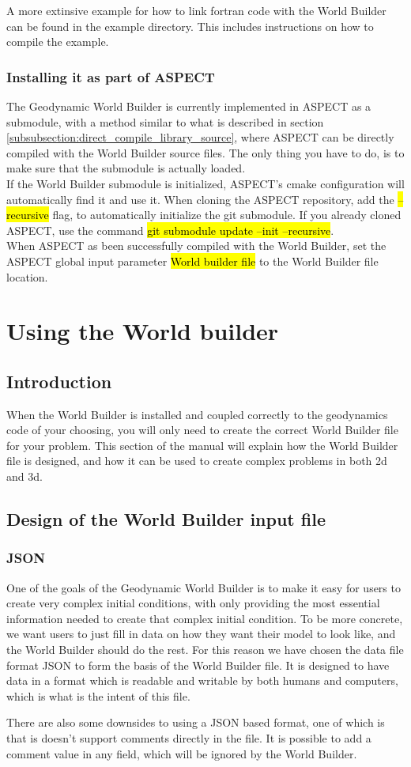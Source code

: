\documentclass{book}
\newcommand{\GWB}{{Geodynamic World Builder}}
\newcommand{\WB}{{World Builder}}
\newcommand{\aspect}{{ASPECT}}
\newcommand{\cmake}{{cmake}}
\begin{document}
A more extinsive example for how to link fortran code with the \WB{} can be found in the example directory. This includes instructions on how to compile the example.

\subsection{Installing it as part of ASPECT}
The \GWB{} is currently implemented in \aspect{} as a submodule, with a method similar to what is described in section \ref{subsubsection:direct_compile_library_source}, where ASPECT can be directly compiled with the \WB{} source files. The only thing you have to do, is to make sure that the submodule is actually loaded.
\\
 If the \WB{} submodule is initialized, \aspect{}'s \cmake{} configuration will automatically find it and use it. When cloning the \aspect{} repository, add the \hl{--recursive} flag, to automatically initialize the git submodule. If you already cloned \aspect{}, use the command \hl{git submodule update --init --recursive}. 
 \\
 When \aspect{} as been successfully compiled with the \WB{}, set the \aspect{} global input parameter \hl{World builder file} to the \WB{} file location. 


\chapter{Using the World builder}
\section{Introduction}
When the \WB{} is installed and coupled correctly to the geodynamics code of your choosing, you will only need to create the correct \WB{} file for your problem. This section of the manual will explain how the \WB{} file is designed, and how it can be used to create complex problems in both 2d and 3d. 
\section{Design of the \WB{} input file}
\subsection{JSON}
One of the goals of the \GWB{} is to make it easy for users to create very complex initial conditions, with only providing the most essential information needed to create that complex initial condition. To be more concrete, we want users to just fill in data on how they want their model to look like, and the \WB{} should do the rest. For this reason we have chosen the data file format JSON to form the basis of the \WB{} file. It is designed to have data in a format which is readable and writable by both humans and computers, which is what is the intent of this file. 
\begin{remark}
There are also some downsides to using a JSON based format, one of which is that is doesn't support comments directly in the file. It is possible to add a comment value in any field, which will be ignored by the \WB{}.
\end{remark}
\end{document}
